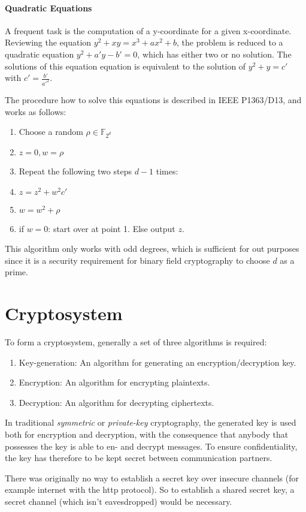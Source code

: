\documentclass[11pt,english]{article}
\begin{document}
\paragraph{Quadratic Equations}
A frequent task is the computation of a y-coordinate for a given x-coordinate. Reviewing the equation $y^2+xy=x^3+ax^2+b$, the problem is reduced to a quadratic equation $y^2+a'y-b'=0$, which has either two or no solution. The solutions of this equation equation is equivalent to the solution of $y^2+y=c'$ with $c'=\frac{b'}{a'^2}$.

The procedure how to solve this equations is described in IEEE P1363/D13, and works as follows:
\begin{enumerate}
 \item Choose a random $\rho\in\mathbb{F}_{2^d}$
 \item $z=0,w=\rho$
 \item Repeat the following two steps $d-1$ times:
 \item $z=z^2+w^2c'$
 \item $w=w^2+\rho$
 \item if $w=0$: start over at point 1. Else output $z$.
\end{enumerate}

This algorithm only works with odd degrees, which is sufficient for out purposes since it is a security requirement for binary field cryptography to choose $d$ as a prime.

\section{Cryptosystem}
To form a cryptosystem, generally a set of three algorithms is required:
\begin{enumerate}
 \item Key-generation: An algorithm for generating an encryption/decryption key.
 \item Encryption: An algorithm for encrypting plaintexts.
 \item Decryption: An algorithm for decrypting ciphertexts.
\end{enumerate}
In traditional \emph{symmetric} or \emph{private-key} cryptography, the generated key is used both for encryption and decryption, with the consequence that anybody that possesses the key is able to en- and decrypt messages. To ensure confidentiality, the key has therefore to be kept secret between communication partners.

There was originally no way to establish a secret key over insecure channels (for example internet with the http protocol). So to establish a shared secret key, a secret channel (which isn't eavesdropped) would be necessary.
\end{document}
